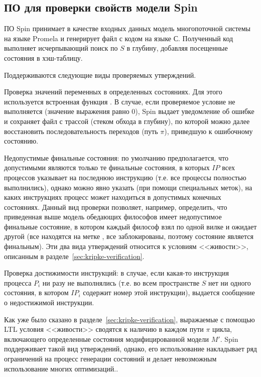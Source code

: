 \subsection{ПО для проверки свойств модели Spin}
\label{sec:spin}

ПО Spin принимает в качестве входных данных модель многопоточной системы на языке Promela
и генерирует файл с кодом на языке С. Полученный код выполняет исчерпывающий поиск по $S$
в глубину, добавляя посещенные состояния в хэш-таблицу.

Поддерживаются следующие виды проверяемых утверждений. 

Проверка значений переменных в определенных состояниях. Для этого используется встроенная
функция . В случае, если проверяемое условие не выполняется (значение
выражения равно 0), Spin выдает уведомление об ошибке и сохраняет файл с трассой (стеком
обхода в глубину), по которой можно далее восстановить последовательность переходов (путь
$\pi$), приведшую к ошибочному состоянию.

Недопустимые финальные состояния: по умолчанию предполагается, что допустимыми являются
только те финальные состояния, в которых $IP$ всех процессов указывает на последнюю
инструкцию (т.е. все процессы полностью выполнились), однако можно явно указать (при
помощи специальных меток), на каких инструкциях процесс может находиться в допустимых
конечных состояниях. Данный вид проверки позволяет, например, определить, что приведенная
выше модель обедающих философов имеет недопустимое финальные состояние, в котором каждый
философ взял по одной вилке и ожидает другой (все находятся на метке , все
заблокированы, поэтому состояние является финальным). Эти два вида утверждений относится к
условиям <<живости>>, описанным в разделе~\ref{sec:kripke-verification}.

Проверка достижимости инструкций: в случае, если какая-то инструкция процесса $P_i$ ни
разу не выполнялись (т.е. во всем пространстве $S$ нет ни одного состояния, в котором
$IP_i$ содержит номер этой инструкции), выдается сообщение о недостижимой инструкции.

Как уже было сказано в разделе~\ref{sec:kripke-verification}, выражаемые с помощью LTL
условия <<живости>> сводятся к наличию в каждом пути $\pi$ цикла, включающего определенные
состояния модифицированной модели $M'$. Spin поддерживает такой вид утверждений, однако,
его использование накладывает ряд ограничений на процесс генерации состояний и делает
невозможным использование многих оптимизаций.\cite{SpinRoot}.

